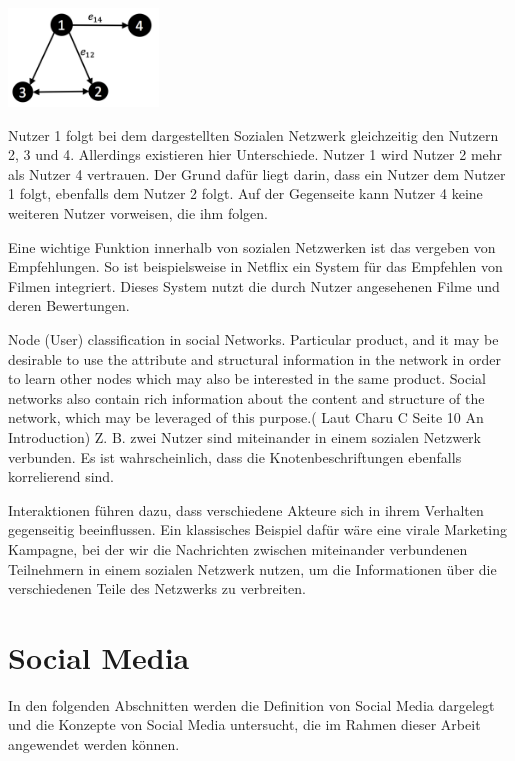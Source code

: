 \begin{description}
\includegraphics[width=0.3\textwidth]{bilder/social-network-users.png}

Nutzer 1 folgt bei dem dargestellten Sozialen Netzwerk  gleichzeitig den Nutzern 2, 3 und 4. Allerdings existieren hier Unterschiede. Nutzer 1 wird Nutzer 2 mehr als Nutzer 4 vertrauen. Der Grund dafür liegt darin, dass ein Nutzer dem Nutzer 1 folgt, ebenfalls dem Nutzer 2 folgt. Auf der Gegenseite kann Nutzer 4 keine weiteren Nutzer vorweisen, die ihm folgen.

Eine wichtige Funktion innerhalb von sozialen Netzwerken ist das vergeben von Empfehlungen. So ist beispielsweise in Netflix ein System für das Empfehlen von Filmen integriert. Dieses System nutzt die durch Nutzer angesehenen Filme und deren Bewertungen.

Node (User) classification in social Networks. Particular product, and it may be desirable to use the attribute and structural information in the network in order to learn other nodes which may also be interested in the same product. Social networks also contain rich information about the content and structure of the network, which may be leveraged of this purpose.( Laut Charu C Seite 10 An Introduction) Z. B. zwei Nutzer sind miteinander in einem sozialen Netzwerk verbunden. Es ist wahrscheinlich, dass die Knotenbeschriftungen ebenfalls korrelierend sind.

Interaktionen führen dazu, dass verschiedene Akteure sich in ihrem Verhalten gegenseitig beeinflussen. Ein klassisches Beispiel dafür wäre eine virale Marketing Kampagne, bei der wir die Nachrichten zwischen miteinander verbundenen Teilnehmern in einem sozialen Netzwerk nutzen, um die Informationen über die verschiedenen Teile des Netzwerks zu verbreiten.
\end{description}


\section{Social Media}

In den folgenden Abschnitten werden die Definition von Social Media dargelegt und die Konzepte von Social Media untersucht, die im Rahmen dieser Arbeit angewendet werden können.



